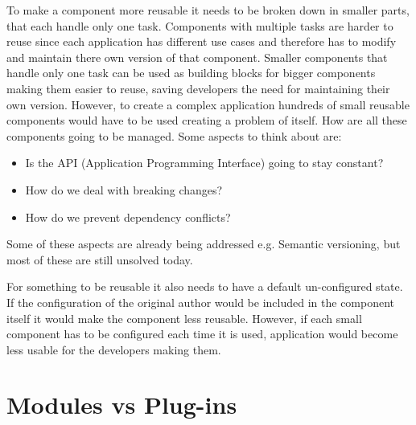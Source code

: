 To make a component more reusable it needs to be broken down in smaller parts, that each handle only one task. Components with multiple tasks are harder to reuse since each application has different use cases and therefore has to modify and maintain there own version of that component. Smaller components that handle only one task can be used as building blocks for bigger components making them easier to reuse, saving developers the need for maintaining their own version. However, to create a complex application hundreds of small reusable components would have to be used creating a problem of itself. How are all these components going to be managed. Some aspects to think about are:
\begin{itemize}
	\item Is the API (Application Programming Interface) going to stay constant?
	\item How do we deal with breaking changes?
	\item How do we prevent dependency conflicts?
\end{itemize}

Some of these aspects are already being addressed e.g. Semantic versioning, but most of these are still unsolved today.

For something to be reusable it also needs to have a default un-configured state. If the configuration of the original author would be included in the component itself it would make the component less reusable. However, if each small component has to be configured each time it is used, application would become less usable for the developers making them.

%

\section{Modules vs Plug-ins}

